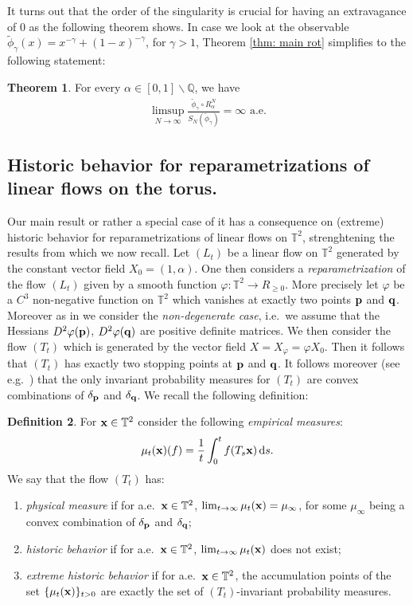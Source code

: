 \documentclass[11pt]{amsart}
\theoremstyle{definition}
\newtheorem{definition}{Definition}[section]
\newtheorem{theorem}[definition]{Theorem}
\numberwithin{equation}{section}
\def\T{\mathbb{T}}
\begin{document}
It turns out that the order of the singularity is crucial for having an extravagance of $0$ as the following theorem shows.
In case we look at the observable $\widetilde{\phi}_{\gamma}(x)= x^{-\gamma}+(1-x)^{-\gamma}$, for $\gamma>1$, Theorem \ref{thm: main rot} simplifies to the following statement:
\begin{theorem}\label{thm: phi beta}
 For every $\alpha\in[0,1]\backslash\mathbb{Q}$, we have
\begin{align*}
  \limsup_{N\to\infty}\frac{\widetilde{\phi}_{\gamma}\circ R_{\alpha}^N}{S_N(\widetilde{\phi}_{\gamma})}=\infty\text{ a.e.}
 \end{align*}
\end{theorem}


\subsection{Historic behavior for reparametrizations of linear flows on the torus.}\label{subsec: hist behav}
Our main result or rather a special case of it has a consequence on (extreme) historic behavior for reparametrizations of linear flows on $\T^2$, strenghtening the results from \cite{An-Gu} which we now recall. Let $(L_t)$ be a linear flow on $\T^2$ generated by the constant vector field $X_0=(1,\alpha)$. One then considers a {\em reparametrization} of the flow $(L_t)$ given by a smooth function $\varphi:\T^2\to R_{\geq 0}$. More precisely let $\varphi$ be a $C^3$ non-negative function on $\T^2$ which vanishes at exactly two points ${\bf p}$ and ${\bf q}$. Moreover as in \cite{An-Gu} we consider the {\em non-degenerate case}, i.e.\ we assume that the Hessians $D^2\varphi ({\bf p})$, $D^2\varphi ({\bf q})$ are positive definite matrices. We then consider the flow $(T_t)$ which is generated by the vector field $X=X_\varphi=\varphi X_0$. Then it follows that $(T_t)$ has exactly two stopping points at ${\bf p}$ and ${\bf q}$. It follows moreover (see e.g.\ \cite{An-Gu}) that the only invariant probability measures for $(T_t)$ are convex combinations of $\delta_{{\bf p}}$ and $\delta_{{\bf q}}$.  We recall the following definition:
\begin{definition}\label{def:hist} For ${\bf x}\in \T^2$ consider the following {\em empirical measures}:
$$
\mu_t({\bf x})(f)=\frac{1}{t}\int_0^t f(T_s{\bf x})\, \mathrm{d}s.
$$
We say that the flow $(T_t)$ has:
\begin{enumerate}
\item[(i)] {\em physical measure} if for a.e.\ ${\bf x}\in \T^2$, $\lim_{t\to \infty} \mu_t({\bf x})= \mu_\infty$, for some $\mu_\infty$ being a convex combination of $\delta_{{\bf p}}$ and $\delta_{{\bf q}}$;
\item[(ii)] {\em historic behavior}  if for a.e.\ ${\bf x}\in \T^2$,  $\lim_{t\to \infty} \mu_t({\bf x})$ does not exist; 
\item[(iii)] {\em extreme historic behavior}  %
if for a.e.\ ${\bf x}\in \T^2$, the accumulation points of the set $\{\mu_t({\bf x})\}_{t>0}$ are exactly the set of $(T_t)$-invariant probability measures.
\end{enumerate}
\end{definition}
\end{document}
